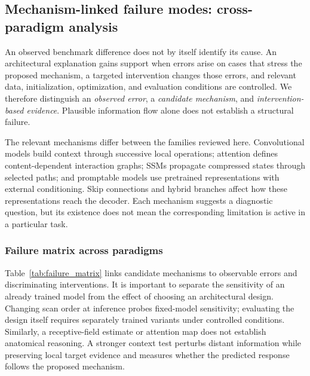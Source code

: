 \documentclass[5p,times,authoryear]{elsarticle}
\begin{document}

\subsection{Mechanism-linked failure modes: cross-paradigm analysis}
\label{subsec:failure_modes}

An observed benchmark difference does not by itself identify its cause. An architectural explanation gains support when errors arise on cases that stress the proposed mechanism, a targeted intervention changes those errors, and relevant data, initialization, optimization, and evaluation conditions are controlled. We therefore distinguish an \emph{observed error}, a \emph{candidate mechanism}, and \emph{intervention-based evidence}. Plausible information flow alone does not establish a structural failure.

The relevant mechanisms differ between the families reviewed here. Convolutional models build context through successive local operations; attention defines content-dependent interaction graphs; SSMs propagate compressed states through selected paths; and promptable models use pretrained representations with external conditioning. Skip connections and hybrid branches affect how these representations reach the decoder. Each mechanism suggests a diagnostic question, but its existence does not mean the corresponding limitation is active in a particular task.

\subsubsection{Failure matrix across paradigms}

Table~\ref{tab:failure_matrix} links candidate mechanisms to observable errors and discriminating interventions. It is important to separate the sensitivity of an already trained model from the effect of choosing an architectural design. Changing scan order at inference probes fixed-model sensitivity; evaluating the design itself requires separately trained variants under controlled conditions. Similarly, a receptive-field estimate or attention map does not establish anatomical reasoning. A stronger context test perturbs distant information while preserving local target evidence and measures whether the predicted response follows the proposed mechanism.
\end{document}
